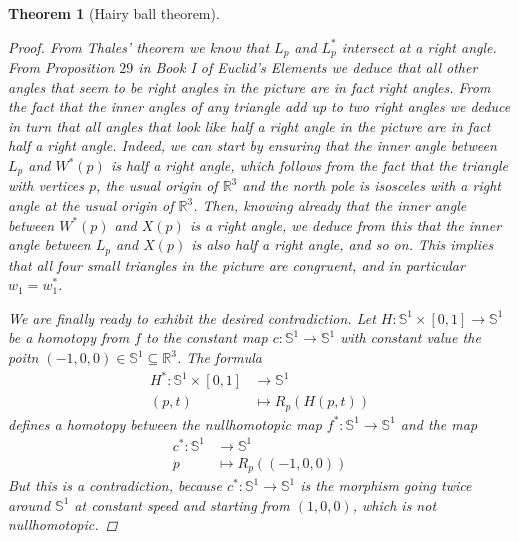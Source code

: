 \documentclass[A4paper, 12pt, british, reqno]{amsart}
\newcommand{\R}{\mathbb{R}} %
\newcommand{\bbS}{\mathbb{S}}
\theoremstyle{plain}
\newtheorem{thm}{Theorem}[section]
\theoremstyle{definition}
\theoremstyle{remark}
\theoremstyle{plain}
\theoremstyle{definition}
\theoremstyle{remark}
\theoremstyle{plain}
\theoremstyle{definition}
\theoremstyle{remark}
\begin{document}
\begin{thm}[Hairy ball theorem]
\begin{proof}
	From Thales' theorem we know that $L_{p}$ and $L^{*}_{p}$ intersect at a right angle.
	From Proposition $29$ in Book I of Euclid's \textit{Elements} we deduce that all other angles that seem to be right angles in the picture are in fact right angles.
	From the fact that the inner angles of any triangle add up to two right angles we deduce in turn that all angles that look like half a right angle in the picture are in fact half a right angle.
	Indeed, we can start by ensuring that the inner angle between $L_{p}$ and $W^{*}(p)$ is half a right angle, which follows from the fact that the triangle with vertices $p$, the usual origin of $\R^{3}$ and the north pole is isosceles with a right angle at the usual origin of $\R^{3}$.
	Then, knowing already that the inner angle between $W^{*}(p)$ and $X(p)$ is a right angle, we deduce from this that the inner angle between $L_{p}$ and $X(p)$ is also half a right angle, and so on.
	This implies that all four small triangles in the picture are congruent, and in particular $w_{1}=w_{1}^{*}$.

	We are finally ready to exhibit the desired contradiction.
	Let $H\colon \bbS^{1}\times [0,1]\to \bbS^{1}$ be a homotopy from $f$ to the constant map $c\colon \bbS^{1}\to \bbS^{1}$ with constant value the poitn $(-1,0,0)\in \bbS^{1}\subseteq \R^{3}$.
	The formula
	\begin{align*}
	    H^{*}\colon \bbS^{1}\times [0,1] & \longrightarrow \bbS^{1} \\
	    (p,t) & \longmapsto R_{p}(H(p,t))
	\end{align*}
	defines a homotopy between the nullhomotopic map $f^{*}\colon \bbS^{1}\to \bbS^{1}$ and the map
	\begin{align*}
	    c^{*}\colon \bbS^{1} & \longrightarrow \bbS^{1} \\
	    p  & \longmapsto R_{p}((-1,0,0))
	\end{align*}
	But this is a contradiction, because $c^{*}\colon \bbS^{1}\to \bbS^{1}$ is the morphism going twice around $\bbS^{1}$ at constant speed and starting from $(1,0,0)$, which is not nullhomotopic.
    \end{proof}
\end{thm}



\vfill
\end{document}
